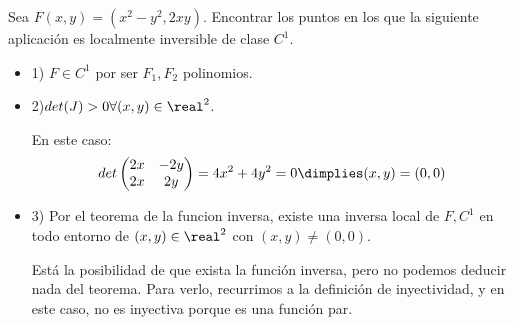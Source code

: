 \begin{problem}[inventado]
\label{inventado}
Sea $F(x,y) = (x^2-y^2,2xy)$. Encontrar los puntos en los que la siguiente aplicación es localmente inversible de clase $C^1$.
\solution
\begin{itemize}
 \item 1) $F \in C^1$ por ser $F_1,F_2$ polinomios.
 \item 2)$det(J)>0 \forall (x,y)\in \real^2$. 
 
 En este caso: $$det\begin{pmatrix}
                  2x&-2y\\
                  2x&2y
                 \end{pmatrix} = 4x^2 + 4y^2 = 0 \dimplies (x,y) = (0,0)$$           
 \item 3) Por el teorema de la funcion inversa, existe una inversa local de $F,C^1$ en todo entorno de $(x,y) \in \real^2$ con $(x,y)\neq (0,0)$. 
 
 Está la posibilidad de que exista la función inversa, pero no podemos deducir nada del teorema. Para verlo, recurrimos a la definición de inyectividad, y en este caso, no es inyectiva porque es una función par.
 \end{itemize}
 \end{problem}
